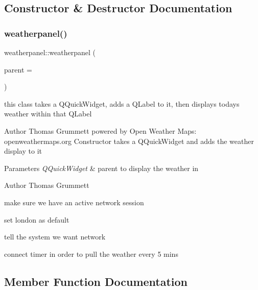 \subsection{Constructor \& Destructor Documentation}
\mbox{\label{classweatherpanel_a4f24bc46cb882bf72f7712a6aca35fbb}} 
\subsubsection{\texorpdfstring{weatherpanel()}{weatherpanel()}}
{\footnotesize\ttfamily weatherpanel\+::weatherpanel (\begin{DoxyParamCaption}\item[{Q\+Quick\+Widget $\ast$}]{parent = {} }\end{DoxyParamCaption})}



this class takes a Q\+Quick\+Widget, adds a Q\+Label to it, then displays todays weather within that Q\+Label 

\begin{DoxyAuthor}{Author}
Thomas Grummett powered by Open Weather Maps\+: openweathermaps.\+org Constructor takes a Q\+Quick\+Widget and adds the weather display to it 
\end{DoxyAuthor}

\begin{DoxyParams}{Parameters}
{\em Q\+Quick\+Widget} & parent to display the weather in \\
\hline
\end{DoxyParams}
\begin{DoxyAuthor}{Author}
Thomas Grummett 
\end{DoxyAuthor}
make sure we have an active network session

set london as default

tell the system we want network

connect timer in order to pull the weather every 5 mins 

\subsection{Member Function Documentation}
\mbox{\label{classweatherpanel_a5a3f8862f3f1ae01783a3e0bc084ba69}} 
